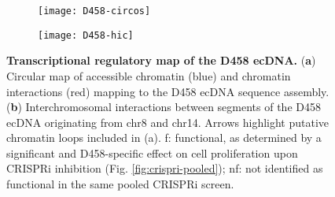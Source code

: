 \begin{figure}[!h]
    \begin{subfigure}{\textwidth}
        \centering
        \texttt{[image: D458-circos]}
        \caption{}
        \label{subfig:D458-circos}
    \end{subfigure}
    \begin{subfigure}{\textwidth}
        \centering
        \texttt{[image: D458-hic]}
        \caption{}
        \label{subfig:D458-hic}
    \end{subfigure}
    \caption[Transcriptional regulatory map of the D458 ecDNA.]{\textbf{Transcriptional regulatory map of the D458 ecDNA.} (\textbf{a}) Circular map of accessible chromatin (blue) and chromatin interactions (red) mapping to the D458 ecDNA sequence assembly. 
    (\textbf{b}) Interchromosomal interactions between segments of the D458 ecDNA originating from chr8 and chr14. Arrows highlight putative chromatin loops included in (a). f: functional, as determined by a significant and D458-specific effect on cell proliferation upon CRISPRi inhibition (Fig. \ref{fig:crispri-pooled}); nf: not identified as functional in the same pooled CRISPRi screen.
    }
    \label{fig:D458-ecDNA}
\end{figure}

